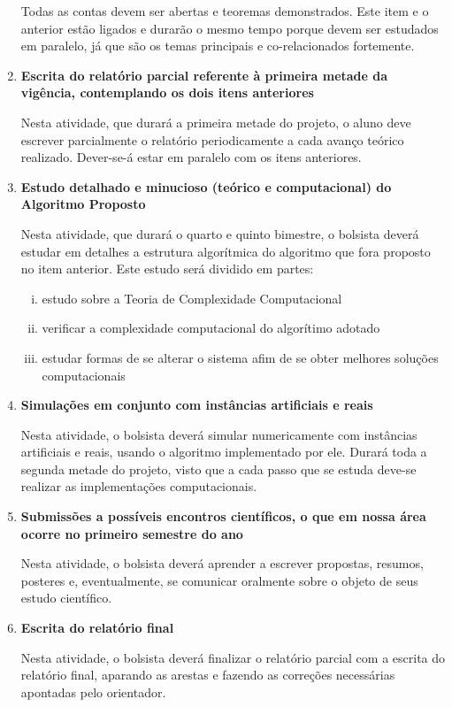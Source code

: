 \documentclass[11pt]{article}
\begin{document}
\begin{enumerate}[(1)]
	 Todas as contas devem ser abertas e teoremas demonstrados. Este item e o anterior estão ligados e durarão o mesmo tempo porque devem ser estudados em paralelo, já que são os temas principais e co-relacionados fortemente.
	
	\item {\bf Escrita do relatório parcial referente à primeira metade da vigência, contemplando os dois itens anteriores}
	
	Nesta atividade, que durará a primeira metade do projeto, o aluno deve escrever parcialmente o relatório periodicamente a cada avanço teórico realizado. Dever-se-á estar em paralelo com os itens anteriores.
	
	\item {\bf Estudo detalhado e minucioso (teórico e computacional) do Algoritmo Proposto}
	
	Nesta atividade, que durará o quarto e quinto bimestre, o bolsista deverá estudar em detalhes a estrutura algorítmica do algoritmo que fora proposto no item anterior. Este estudo será dividido em partes:
	
	\begin{enumerate}[(i)]
		\item estudo sobre a Teoria de Complexidade Computacional
		
		\item verificar a complexidade computacional do algorítimo adotado
		
		\item estudar formas de se alterar o sistema afim de se obter melhores soluções computacionais
	\end{enumerate}
	
	\item {\bf Simulações em conjunto com instâncias artificiais e reais}
	
	Nesta atividade, o bolsista deverá simular numericamente com instâncias artificiais e reais, usando o algoritmo implementado por ele. Durará toda a segunda metade do projeto, visto que a cada passo que se estuda deve-se realizar as implementações computacionais.
	
	\item {\bf Submissões a possíveis encontros científicos, o que em nossa área ocorre no primeiro semestre do ano}
	
	Nesta atividade, o bolsista deverá aprender a escrever propostas, resumos, posteres e, eventualmente, se comunicar oralmente sobre o objeto de seus estudo científico.
	
	\item {\bf Escrita do relatório final}
	
	Nesta atividade, o bolsista deverá finalizar o relatório parcial com a escrita do relatório final, aparando as arestas e fazendo as correções necessárias apontadas pelo orientador.
	\end{enumerate}
	
\end{document}
